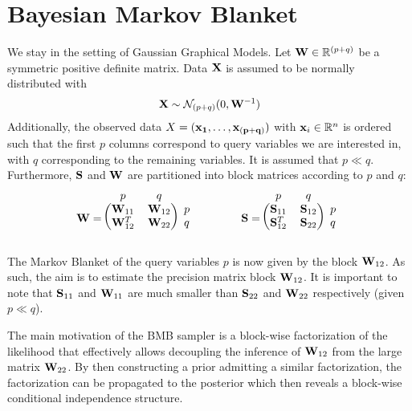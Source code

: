 \section{Bayesian Markov Blanket}
We stay in the setting of Gaussian Graphical Models.
Let $\mathbf{W} \in \mathbb{R}^{(p+q)}$ be a symmetric positive definite matrix.
Data $\mathbf{X}$ is assumed to be normally distributed with
$$
\mathbf{X} \sim \mathcal{N}_{(p+q)}(0,\mathbf{W}^{-1})
$$ 
Additionally, the observed data $X=(\mathbf{x_1}, \dots, \mathbf{x_{(p+q)}})$ with $\mathbf{x}_i\in\mathbb{R}^{n}$ is ordered such that the first $p$ columns correspond to query variables we are interested in, with $q$ corresponding to the remaining variables.
It is assumed that $p\ll q$.
Furthermore, $\mathbf{S}$ and $\mathbf{W}$ are partitioned into block matrices according to $p$ and $q$:
\begin{equation*}
\matr{W}=
\raisebox{0.3\baselineskip}{$
	\begin{blockarray}{ccc}
	p & q& \\
	\begin{block}{(cc)l}
	\matr{W}_{11} & \matr{W}_{12}&p \\
	\matr{W}_{12}^T & \matr{W}_{22}&q \\
	\end{block}
	\end{blockarray}
	$}
\quad \quad \quad \quad 
\matr{S}=
\raisebox{0.3\baselineskip}{$
	\begin{blockarray}{ccc}
	p & q& \\
	\begin{block}{(cc)l}
	\matr{S}_{11} & \matr{S}_{12}&p \\
	\matr{S}_{12}^T & \matr{S}_{22}&q \\
	\end{block}
	\end{blockarray}
	$}
\end{equation*}

The Markov Blanket of the query variables $p$ is now given by the block $\mathbf{W}_{12}$.
As such, the aim is to estimate the precision matrix block $\mathbf{W}_{12}$.
It is important to note that $\mathbf{S}_{11}$ and $\mathbf{W}_{11}$ are much smaller than $\mathbf{S}_{22}$ and $\mathbf{W}_{22}$ respectively (given $p\ll q$).

The main motivation of the \gls{BMB} sampler is a block-wise factorization of the likelihood that effectively allows decoupling the inference of $\mathbf{W}_{12}$ from the large matrix $\mathbf{W}_{22}$.
By then constructing a prior admitting a similar factorization, the factorization can be propagated to the posterior which then reveals a block-wise conditional independence structure.

